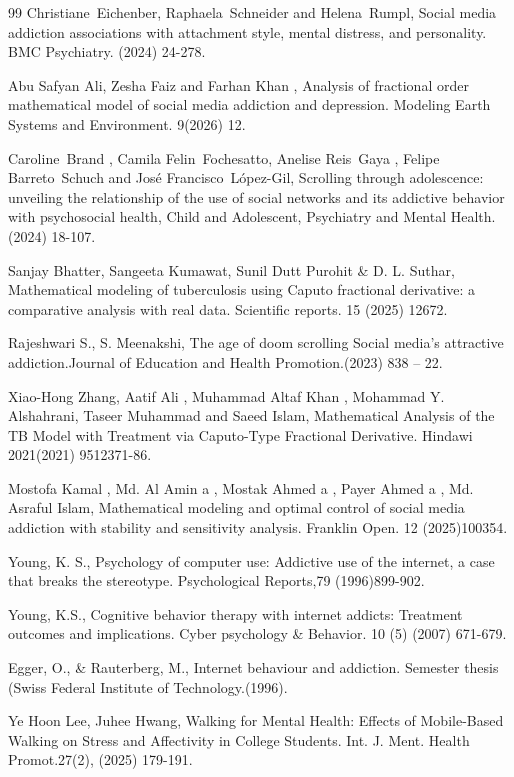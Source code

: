 \documentclass[10pt]{NSP1}
\begin{document}
\begin{thebibliography}{99}
Christiane Eichenber, Raphaela Schneider and Helena Rumpl, Social media addiction associations with attachment style, mental distress, and personality. BMC Psychiatry. (2024) 24-278.

Abu Safyan Ali, Zesha Faiz and Farhan Khan , Analysis of fractional order mathematical model of social media addiction and depression. Modeling Earth Systems and Environment. 9(2026) 12.

Caroline Brand , Camila Felin Fochesatto, Anelise Reis Gaya , Felipe Barreto Schuch and José Francisco López-Gil, Scrolling through adolescence: unveiling the relationship of the use of social networks and its addictive behavior with psychosocial health, Child and Adolescent, Psychiatry and Mental Health. (2024) 18-107.

Sanjay Bhatter, Sangeeta Kumawat, Sunil Dutt Purohit \& D. L. Suthar, Mathematical modeling of tuberculosis using Caputo fractional derivative: a comparative analysis with real data. Scientific reports. 15 (2025) 12672.

Rajeshwari S., S. Meenakshi, The age of doom scrolling Social media’s attractive addiction.Journal of Education and Health Promotion.(2023) 838 – 22.

Xiao-Hong Zhang, Aatif Ali , Muhammad Altaf Khan , Mohammad Y. Alshahrani, Taseer Muhammad and Saeed Islam, Mathematical Analysis of the TB Model with Treatment via Caputo-Type Fractional Derivative. Hindawi 2021(2021) 9512371-86.

Mostofa Kamal , Md. Al Amin a , Mostak Ahmed a , Payer Ahmed a , Md. Asraful Islam, Mathematical modeling and optimal control of social media addiction with stability and sensitivity analysis. Franklin Open. 12 (2025)100354.

Young, K. S., Psychology of computer use: Addictive use of the internet, a case that breaks the stereotype. Psychological Reports,79 (1996)899-902.

Young, K.S., Cognitive behavior therapy with internet addicts: Treatment outcomes and implications. Cyber psychology \& Behavior. 10 (5) (2007) 671-679.

Egger, O., \& Rauterberg, M., Internet behaviour and addiction. Semester thesis (Swiss Federal Institute of Technology.(1996).

Ye Hoon Lee, Juhee Hwang, Walking for Mental Health: Effects of Mobile-Based Walking on Stress and Affectivity in College Students. Int. J. Ment. Health Promot.27(2), (2025) 179-191.


\end{thebibliography}
\end{document}

